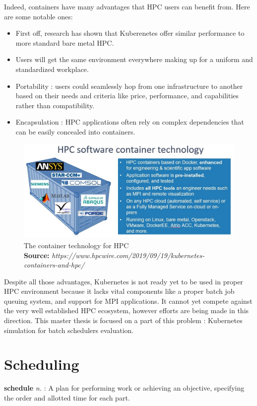 \documentclass[12pt, a4paper]{memoir}
\newcommand*{\captionsource}[2]{%
    \caption[{#1}]{%
        #1%
        \\\hspace{\linewidth}%
	\textbf{Source:} \textit{#2}%
    }%
}
\begin{document}
Indeed, containers have many advantages that HPC users can benefit from. Here
are some notable ones:
\begin{itemize}
	\item First off, research has shown that Kuberenetes offer similar
		performance to more standard bare metal HPC\cite{8950981}.
	\item Users will get the same environment everywhere making up for a
		uniform and standardized workplace.
	\item Portability : users could seamlessly hop from one infrastructure
		to another based on their needs and criteria like price,
		performance, and capabilities rather than compatibility.
	\item Encapsulation : HPC applications often rely on complex
		dependencies that can be easily concealed into containers.
\end{itemize}
\begin{figure}[h]
	\centering
	\includegraphics[scale=0.5]{../imgs/hpc-container.jpg}
	\captionsource{The container technology for HPC}{https://www.hpcwire.com/2019/09/19/kubernetes-containers-and-hpc/}
	\label{fig:hpc-container}
\end{figure}

Despite all those advantages, Kubernetes is not ready yet to be used
in proper HPC environment because it lacks vital components like a proper batch
job queuing system, and support for MPI applications. It cannot yet compete
against the very well established HPC ecosystem, however efforts are being made
in this direction. This master thesis is focused on a part of this problem :
Kubernetes simulation for batch schedulers evaluation.

\section{Scheduling}
\begin{displayquote}[][]
	\textbf{schedule} \textit{n.} : A plan for
	performing work or achieving an objective, specifying the order and
	allotted time for each part.
\end{displayquote}
\end{document}
